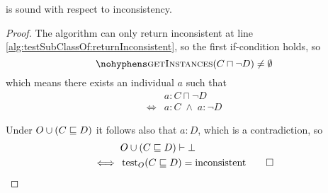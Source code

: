 \documentclass[paper.tex]{subfiles}
\begin{document}
\begin{lemma}
  \label{lem:testSubClassOfInconsistentSound}
   is sound with respect to inconsistency.
\end{lemma}
\begin{proof}
  The algorithm can only return inconsistent at line \ref{alg:testSubClassOf:returnInconsistent}, so the first if-condition holds, so
  \[ \textproc{getInstances}(C \sqcap \neg D) \ne \emptyset \]
  which means there exists an individual $a$ such that
  \begin{align*}
    & a : C \sqcap \neg D \\
    \iff{}& a : C \;\land\; a : \neg D
  \end{align*}

  Under $O \cup (C \sqsubseteq D)$ it follows also that $a : D$, which is a contradiction, so
  \begin{align*}
    & O \cup (C \sqsubseteq D) \vdash \bot \\
    \iff{}& \operatorname{test}_O(C \sqsubseteq D) = \mathrm{inconsistent}
    \qed
  \end{align*}
\end{proof}
\end{document}
